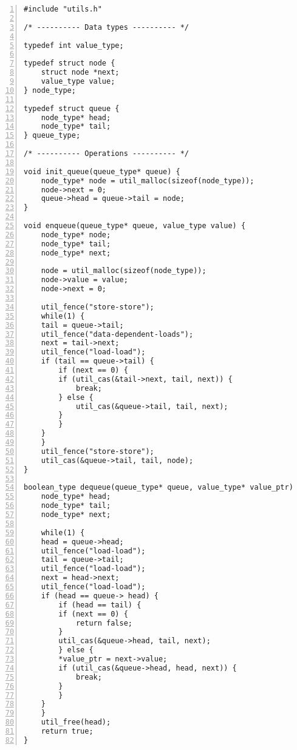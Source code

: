 \begin{Verbatim}[numbers=left]
#include "utils.h"

/* ---------- Data types ---------- */

typedef int value_type;

typedef struct node {
    struct node *next;
    value_type value;
} node_type;

typedef struct queue {
    node_type* head;
    node_type* tail;
} queue_type;

/* ---------- Operations ---------- */

void init_queue(queue_type* queue) {
    node_type* node = util_malloc(sizeof(node_type));
    node->next = 0;
    queue->head = queue->tail = node;
}

void enqueue(queue_type* queue, value_type value) {
    node_type* node;
    node_type* tail;
    node_type* next;

    node = util_malloc(sizeof(node_type));
    node->value = value;
    node->next = 0;

    util_fence("store-store");
    while(1) {
    tail = queue->tail;
    util_fence("data-dependent-loads");
    next = tail->next;
    util_fence("load-load");
    if (tail == queue->tail) {
        if (next == 0) {
        if (util_cas(&tail->next, tail, next)) {
            break;
        } else {
            util_cas(&queue->tail, tail, next);
        }
        }
    }
    }
    util_fence("store-store");
    util_cas(&queue->tail, tail, node);
}

boolean_type dequeue(queue_type* queue, value_type* value_ptr) {
    node_type* head;
    node_type* tail;
    node_type* next;

    while(1) {
    head = queue->head;
    util_fence("load-load");
    tail = queue->tail;
    util_fence("load-load");
    next = head->next;
    util_fence("load-load");
    if (head == queue-> head) {
        if (head == tail) {
        if (next == 0) {
            return false;
        }
        util_cas(&queue->head, tail, next);
        } else {
        *value_ptr = next->value;
        if (util_cas(&queue->head, head, next)) {
            break;
        }
        }
    }
    }
    util_free(head);
    return true;
}
\end{Verbatim}